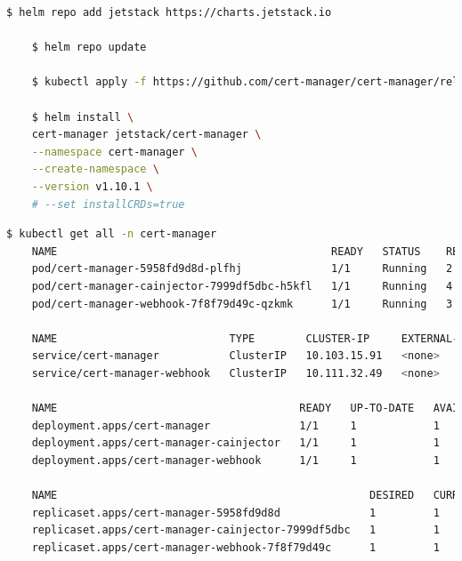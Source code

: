 \documentclass[12pt,a4paper]{report}
\begin{document}
	\begin{lstlisting}[language=Bash]
	$ helm repo add jetstack https://charts.jetstack.io
	
	$ helm repo update
	
	$ kubectl apply -f https://github.com/cert-manager/cert-manager/releases/download/v1.10.1/cert-manager.crds.yaml
	
	$ helm install \
	cert-manager jetstack/cert-manager \
	--namespace cert-manager \
	--create-namespace \
	--version v1.10.1 \
	# --set installCRDs=true
	\end{lstlisting}
	\hspace{1.0cm}{Sau khi chạy thành công, Cert Manager đã được triển khai thành công trên kubernetes. Để kiểm tra, chúng ta sử dụng câu lệnh sau:}
	\begin{lstlisting}[language=Bash]
	$ kubectl get all -n cert-manager
	NAME                                           READY   STATUS    RESTARTS       AGE
	pod/cert-manager-5958fd9d8d-plfhj              1/1     Running   2 (3h1m ago)   2d22h
	pod/cert-manager-cainjector-7999df5dbc-h5kfl   1/1     Running   4 (3h ago)     2d22h
	pod/cert-manager-webhook-7f8f79d49c-qzkmk      1/1     Running   3 (3h1m ago)   2d22h
	
	NAME                           TYPE        CLUSTER-IP     EXTERNAL-IP   PORT(S)    AGE
	service/cert-manager           ClusterIP   10.103.15.91   <none>        9402/TCP   2d22h
	service/cert-manager-webhook   ClusterIP   10.111.32.49   <none>        443/TCP    2d22h
	
	NAME                                      READY   UP-TO-DATE   AVAILABLE   AGE
	deployment.apps/cert-manager              1/1     1            1           2d22h
	deployment.apps/cert-manager-cainjector   1/1     1            1           2d22h
	deployment.apps/cert-manager-webhook      1/1     1            1           2d22h
	
	NAME                                                 DESIRED   CURRENT   READY   AGE
	replicaset.apps/cert-manager-5958fd9d8d              1         1         1       2d22h
	replicaset.apps/cert-manager-cainjector-7999df5dbc   1         1         1       2d22h
	replicaset.apps/cert-manager-webhook-7f8f79d49c      1         1         1       2d22h
	\end{lstlisting}
	\hspace{1.0cm}{Tiếp theo đấy, chúng ta bắt đầu triển khai Jaeger. Để triển khai Jaeger, chúng ta cần chạy câu lệnh sau:}
\end{document}
